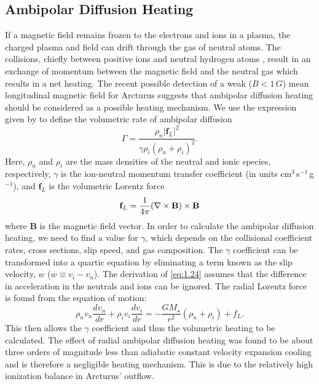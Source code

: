 \subsection{Ambipolar Diffusion Heating}\label{sec:7.4.2}
If a magnetic field remains frozen to the electrons and ions in a plasma, the charged plasma and field can drift through the gas of neutral atoms. The collisions, chiefly between positive ions and neutral hydrogen atoms \citep{spitzer_1978}, result in an exchange of momentum between the magnetic field and the neutral gas which results in a net heating. The recent possible detection of a weak ($B < 1\,G$) mean longitudinal magnetic field for Arcturus \citep{sennhauser_2011} suggests that ambipolar diffusion heating should be considered as a possible heating mechanism.  We use the expression given by \cite{shang_2002} to define the volumetric rate of ambipolar  diffusion 
\begin{equation}\label{eq:1.24}
\Gamma = \frac{\rho _{n}|\mathbf{f}_{L}|^2}{\gamma \rho _{i}(\rho _{n}+\rho _{i})^2}.
\end{equation}
Here, $\rho _{n}$ and $\rho _{i}$ are the mass densities of the neutral and ionic species, respectively, $\gamma$ is the ion-neutral momentum transfer coefficient (in units cm$^3$\,s$^{-1}$\,g$^{-1}$), and $\textbf{f}_{L}$ is the volumetric Lorentz force
\begin{equation}
\textbf{f}_{L}=\frac{1}{4\pi}({\bf \nabla } \times \textbf{B})\times \textbf{B}
\end{equation}
where \textbf{B} is the magnetic field vector. In order to calculate the ambipolar diffusion heating, we need to find a value for $\gamma$, which depends on the collisional coefficient rates, cross sections, slip speed, and gas composition. The $\gamma$ coefficient can be transformed into a quartic equation by eliminating a term known as the slip velocity, $w$ ($w\equiv v_{i}-v_{n}$). The derivation of \ref{eq:1.24} assumes that the difference in acceleration in the neutrals and ions can be ignored. The radial Lorentz force is found from the equation of motion:
\begin{equation}
\rho _{n}v_{n}\frac{dv_{n}}{dr}+\rho _{i}v_{i}\frac{dv_{i}}{dr}=-\frac{GM_{\star}}{r^2}(\rho _{n} + \rho _{i})+f_{L}.
\end{equation}
This then allows the $\gamma$ coefficient and thus the volumetric heating to be calculated. The effect of radial ambipolar diffusion heating was found to be about three orders of magnitude less than adiabatic constant velocity expansion cooling and is therefore a negligible heating mechanism. This is due to the relatively high ionization balance in Arcturus' outflow.

